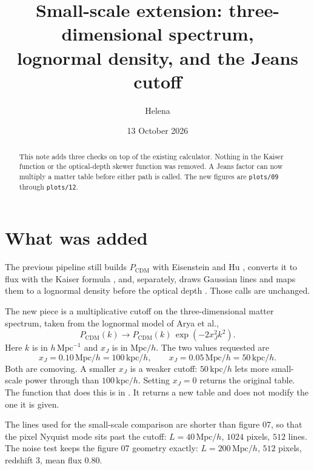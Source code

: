 \documentclass[11pt]{article}
\title{Small-scale extension: three-dimensional spectrum,\\ lognormal density, and the Jeans cutoff}
\author{Helena}
\date{13 October 2026}
\begin{document}
\maketitle

\begin{abstract}
This note adds three checks on top of the existing calculator. Nothing in the Kaiser function or the optical-depth skewer function was removed. A Jeans factor can now multiply a matter table before either path is called. The new figures are \texttt{plots/09} through \texttt{plots/12}.
\end{abstract}

\section{What was added}

The previous pipeline still builds $P_\mathrm{CDM}$ with Eisenstein and Hu \cite{Eisenstein:1997ik}, converts it to flux with the Kaiser formula \cite{Kaiser:1987qv,McDonald:2001fe}, and, separately, draws Gaussian lines and maps them to a lognormal density before the optical depth \cite{Coles:1991if,Bi:1996fh,Hui:1997dp,Arya:2022uke}. Those calls are unchanged.

The new piece is a multiplicative cutoff on the three-dimensional matter spectrum, taken from the lognormal model of Arya et al.,
\begin{equation}
\label{eq:jeans}
P_\mathrm{CDM}(k) \to P_\mathrm{CDM}(k)\,\exp(-2 x_J^{2} k^{2}).
\end{equation}
Here $k$ is in $h\,\mathrm{Mpc}^{-1}$ and $x_J$ is in $\mathrm{Mpc}/h$. The two values requested are
\begin{equation}
x_J = 0.10\,\mathrm{Mpc}/h = 100\,\mathrm{kpc}/h,
\qquad
x_J = 0.05\,\mathrm{Mpc}/h = 50\,\mathrm{kpc}/h.
\end{equation}
Both are comoving. A smaller $x_J$ is a weaker cutoff: $50\,\mathrm{kpc}/h$ lets more small-scale power through than $100\,\mathrm{kpc}/h$. Setting $x_J=0$ returns the original table. The function that does this is  in . It returns a new table and does not modify the one it is given.

The lines used for the small-scale comparison are shorter than figure 07, so that the pixel Nyquist mode sits past the cutoff: $L=40\,\mathrm{Mpc}/h$, $1024$ pixels, $512$ lines. The noise test keeps the figure 07 geometry exactly: $L=200\,\mathrm{Mpc}/h$, $512$ pixels, redshift $3$, mean flux $0.80$.
\end{document}
